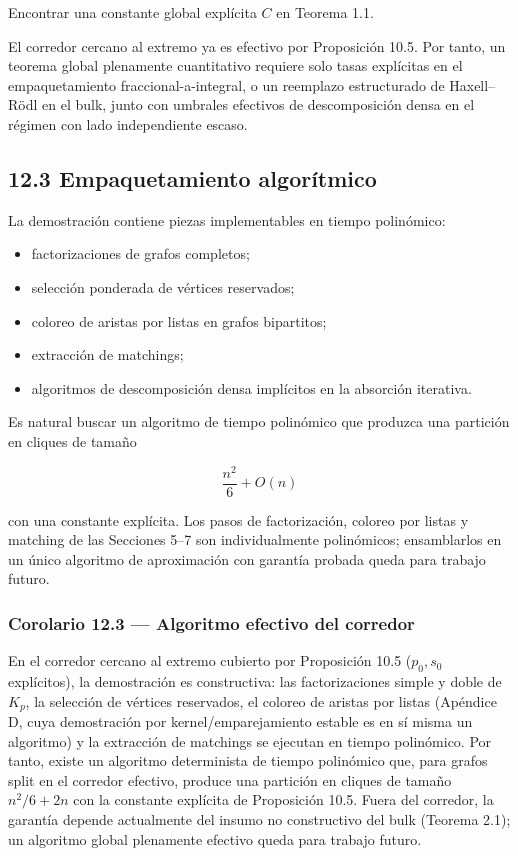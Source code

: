 \documentclass[
  11pt,
]{article}
\providecommand{\tightlist}{%
  \setlength{\itemsep}{0pt}\setlength{\parskip}{0pt}}
\begin{document}
Encontrar una constante global explícita \(C\) en Teorema 1.1.

El corredor cercano al extremo ya es efectivo por Proposición 10.5. Por
tanto, un teorema global plenamente cuantitativo requiere solo tasas
explícitas en el empaquetamiento fraccional-a-integral, o un reemplazo
estructurado de Haxell--Rödl en el bulk, junto con umbrales efectivos de
descomposición densa en el régimen con lado independiente escaso.

\subsection{12.3 Empaquetamiento
algorítmico}\label{empaquetamiento-algoruxedtmico}

La demostración contiene piezas implementables en tiempo polinómico:

\begin{itemize}
\tightlist
\item
  factorizaciones de grafos completos;
\item
  selección ponderada de vértices reservados;
\item
  coloreo de aristas por listas en grafos bipartitos;
\item
  extracción de matchings;
\item
  algoritmos de descomposición densa implícitos en la absorción
  iterativa.
\end{itemize}

Es natural buscar un algoritmo de tiempo polinómico que produzca una
partición en cliques de tamaño

\[
\frac{n^2}{6}+O(n)
\]

con una constante explícita. Los pasos de factorización, coloreo por
listas y matching de las Secciones 5--7 son individualmente polinómicos;
ensamblarlos en un único algoritmo de aproximación con garantía probada
queda para trabajo futuro.

\subsubsection{Corolario 12.3 --- Algoritmo efectivo del
corredor}\label{corolario-12.3-algoritmo-efectivo-del-corredor}

En el corredor cercano al extremo cubierto por Proposición 10.5
(\(p_0,s_0\) explícitos), la demostración es constructiva: las
factorizaciones simple y doble de \(K_p\), la selección de vértices
reservados, el coloreo de aristas por listas (Apéndice D, cuya
demostración por kernel/emparejamiento estable es en sí misma un
algoritmo) y la extracción de matchings se ejecutan en tiempo
polinómico. Por tanto, existe un algoritmo determinista de tiempo
polinómico que, para grafos split en el corredor efectivo, produce una
partición en cliques de tamaño \(n^2/6+2n\) con la constante explícita
de Proposición 10.5. Fuera del corredor, la garantía depende actualmente
del insumo no constructivo del bulk (Teorema 2.1); un algoritmo global
plenamente efectivo queda para trabajo futuro.
\end{document}
